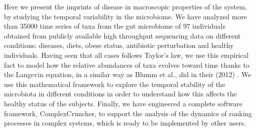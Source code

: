 Here we present the imprints of disease in macroscopic properties of the system, by studying the temporal variability in the microbiome. We have analyzed more than 35000 time series of taxa from the gut microbiome of 97 individuals obtained from publicly available high throughput sequencing data on different conditions: diseases, diets, obese status, antibiotic perturbation and healthy individuals. Having seen that all cases follows Taylor's law, we use this empirical fact to model how the relative abundances of taxa evolves toward time thanks to the Langevin equation, in a similar way as Blumm et al., did in their (2012) \cite{ranking}. We use this mathematical framework to explore the temporal stability of the microbiota in different conditions in order to understand how this affects the healthy status of the subjects. Finally, we have engineered a complete software framework, ComplexCruncher, to support the analysis of the dynamics of ranking processes in complex systems, which is ready to be implemented by other users.